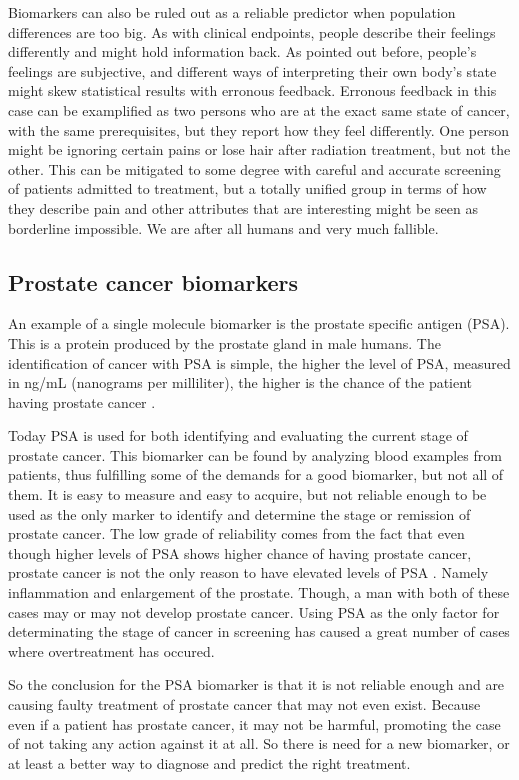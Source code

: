 Biomarkers can also be ruled out as a reliable predictor when population
differences are too big\cite{biomarker3}. As with clinical endpoints, people
describe their feelings differently and might hold information back. As pointed
out before, people's feelings are subjective, and different ways of interpreting
their own body's state might skew statistical results with erronous feedback.
Erronous feedback in this case can be examplified as two persons who are at the
exact same state of cancer, with the same prerequisites, but they report how
they feel differently. One person might be ignoring certain pains or lose hair
after radiation treatment, but not the other. This can be mitigated to some
degree with careful and accurate screening of patients admitted to treatment,
but a totally unified group in terms of how they describe pain and other
attributes that are interesting might be seen as borderline impossible. We are
after all humans and very much fallible.

\subsection{Prostate cancer biomarkers}
An example of a single molecule biomarker is the prostate specific antigen
(PSA). This is a protein produced by the prostate gland in male humans. The
identification of cancer with PSA is simple, the higher the level of PSA,
measured in ng/mL (nanograms per milliliter), the higher is the chance of the
patient having prostate cancer \cite{cancerfacts}.

Today PSA is used for both identifying and evaluating the current stage of
prostate cancer. This biomarker can be found by analyzing blood examples from
patients, thus fulfilling some of the demands for a good biomarker, but not all
of them. It is easy to measure and easy to acquire, but not reliable enough to
be used as the only marker to identify and determine the stage or remission of
prostate cancer. The low grade of reliability comes from the fact that even
though higher levels of PSA shows higher chance of having prostate cancer,
prostate cancer is not the only reason to have elevated levels of PSA
\cite{cancerfacts}. Namely inflammation and enlargement of the prostate. Though,
a man with both of these cases may or may not develop prostate cancer. Using PSA
as the only factor for determinating the stage of cancer in screening has caused
a great number of cases where overtreatment has occured\cite{psa-overtreatment}.

So the conclusion for the PSA biomarker is that it is not reliable enough and
are causing faulty treatment of prostate cancer that may not even exist. Because
even if a patient has prostate cancer, it may not be harmful, promoting the case
of not taking any action against it at all. So there is need for a new
biomarker, or at least a better way to diagnose and predict the right treatment.

